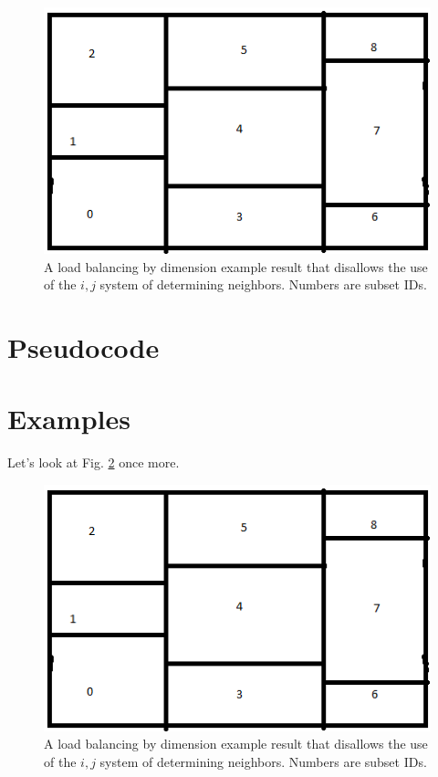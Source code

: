 \documentclass[11pt, letterpaper,titlepage,oneside]{article}
\begin{document}
\begin{figure}[H]
\centering
\includegraphics{Now.png}
\caption{A load balancing by dimension example result that disallows the use of the $i,j$ system of determining neighbors. Numbers are subset IDs.}
\label{now}
\end{figure}

\newpage
\section*{Pseudocode}



\newpage
\section*{Examples}

Let's look at Fig. \ref{now} once more.

\begin{figure}[H]
\centering
\includegraphics{Now.png}
\caption{A load balancing by dimension example result that disallows the use of the $i,j$ system of determining neighbors. Numbers are subset IDs.}
\label{now}
\end{figure}
\end{document}
